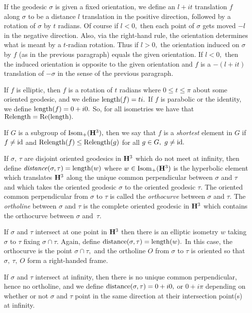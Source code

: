 If the geodesic $\sigma$ is  given a fixed orientation, we define an $l+it$
translation $f$ along $\sigma$  to be a distance $l$ translation in the positive
direction, followed by a rotation of $\sigma$ by $t$ radians.  Of course if
$l < 0,$ then each point of $\sigma$ gets moved $-l$ in the negative direction.
Also, via the right-hand rule, the orientation determines what is meant
by a $t$-radian rotation.  Thus if $l > 0,$ the orientation induced on
$\sigma$ by $f$ (as in the previous paragraph) equals the given orientation.
If $l < 0,$ then the induced orientation is opposite to the given orientation
and $f$ is a $-(l+it)$ translation of $-\sigma$ in the sense of the previous
paragraph.

If $f$ is elliptic, then $f$ is a rotation of $t$ radians where 
$0 \le t \le \pi$ about some oriented geodesic, and we define ${\rm length}(f) = t i.$ 
If $f$ is parabolic or the identity, we define ${\rm length}(f) = 0 + i0.$
So, for all isometries we have that ${\rm Relength} = {\rm Re}({\rm length}).$
\enddemo

   If
$G$ is a subgroup of ${\rm Isom}_+({\bf H}^3),$ then  we say that $f$ is a {\it shortest} element  in $G$ if $f\neq {\rm id}$ and
${\rm Relength}(f)\le {\rm Relength}(g)$
for all \pagebreak $g\in G, \ g\neq {\rm id}.$
\enddemo
 
  If $\sigma,\ \tau$ are disjoint oriented geodesics  in 
${\bf H}^3$ which do not meet at infinity,
then define
${\it distance}(\sigma,\tau)={\rm length}(w)$ where 
$w\in {\rm Isom}_+({\bf H}^3)$ is the hyperbolic
element which translates ${\bf H}^3$
along the unique common perpendicular between $\sigma$ and $\tau$ and which takes the
oriented geodesic $\sigma$ to the
oriented geodesic $\tau$.  The oriented common perpendicular from $\sigma$ to $\tau$ is
called the {\it orthocurve} between $\sigma$
and $\tau$.  The {\it ortholine} between $\sigma$ and $\tau$ is the complete oriented
geodesic in ${\bf H}^3$ which contains the
orthocurve between $\sigma$ and~$\tau$.

If $\sigma$ and $\tau$ intersect at one point in ${\bf H}^3$ then 
there is an elliptic isometry $w$ taking $\sigma$ to $\tau$ fixing $\sigma \cap \tau.$  Again,  define ${\rm distance}(\sigma, \tau) = {\rm length}(w).$  In this case, the orthocurve is the point $\sigma \cap \tau,$ and the ortholine $O$ from $\sigma$ to $\tau$ is oriented
so that $\sigma,\ \tau,\ O$ form a right-handed frame.

If $\sigma$ and $\tau$ intersect at infinity, then there is no unique common perpendicular, hence no ortholine, and we define
${\rm distance}(\sigma,\tau) = 0 + i0,$ or $0 + i\pi$ depending on whether or not $\sigma$ and $\tau$ point in the same direction at their intersection point(s) at infinity.

